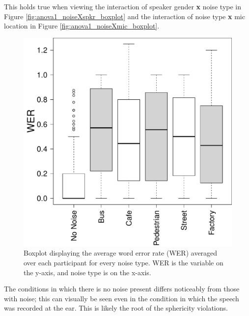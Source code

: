 \documentclass[dissertation,copyright]{uathesis}
\makeatletter
\def\maxwidth{ %
  \ifdim\Gin@nat@width>\linewidth
    \linewidth
  \else
    \Gin@nat@width
  \fi
}
\makeatother
\begin{document}
This holds true when viewing the interaction of speaker gender \textbf{x} noise type in Figure \ref{fig:anova1_noiseXspkr_boxplot} and the interaction of noise type \textbf{x} mic location in Figure \ref{fig:anova1_noiseXmic_boxplot}.
%
\begin{figure}

\includegraphics[width=\maxwidth]{figure/boxplot_noise-1} 

\caption{Boxplot displaying the average word error rate (WER) averaged over each participant for every noise type. WER is the variable on the y-axis, and noise type is on the x-axis.}
\label{fig:anova1_noise_boxplot}
\end{figure}
%
The conditions in which there is no noise present differs noticeably from those with noise; this can visually be seen even in the condition in which the speech was recorded at the ear. This is likely the root of the sphericity violations.
\end{document}
